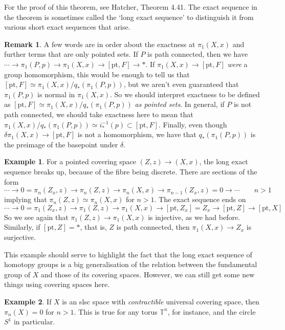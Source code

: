 \documentclass{tufte-handout}
\def\pt {\mathrm{pt}}
\theoremstyle{definition}
\newtheorem{example}{Example}
\newtheorem*{rem}{Remark}
\begin{document}
For the proof of this theorem, see Hatcher, Theorem 4.41. The exact sequence in the theorem is sometimes called the `long exact sequence' to distinguish it from various short exact sequences that arise.

\begin{rem}
A few words are in order about the exactness at $\pi_1(X,x)$ and further terms that are only pointed sets. If $P$ is path connected, then we have $\cdots \to \pi_1(P,p)\to \pi_1(X,x) \to [\pt,F] \to *$. If $\pi_1(X,x) \to [\pt,F]$ \emph{were} a group homomorphism, this would be enough to tell us that $[\pt,F] \simeq \pi_1(X,x)/q_*(\pi_1(P,p))$, but we aren't even guaranteed that $\pi_1(P,p)$ is normal in $\pi_1(X,x)$. So we should interpret exactness to be defined as $[\pt,F] \simeq \pi_1(X,x)/q_*(\pi_1(P,p))$ \emph{as pointed sets}. In general, if $P$ is not path connected, we should take exactness here to mean that $\pi_1(X,x)/q_*(\pi_1(P,p))\simeq i_*^{-1}(p)\subset [\pt,F]$. Finally, even though $\delta \pi_1(X,x) \to [\pt,F]$ is not a homomorphism, we have that $q_*(\pi_1(P,p))$ is the preimage of the basepoint under $\delta$.
\end{rem}

\begin{example}
For a pointed covering space $(Z,z)\to (X,x)$, the long exact sequence breaks up, because of the fibre being discrete. There are sections of the form
\[
  \cdots \to 0 = \pi_n(Z_x,z) \to \pi_n(Z,z) \to \pi_n(X,x) \to \pi_{n-1}(Z_x,z) = 0 \to \cdots \qquad n >1
\]
implying that $\pi_n(Z,z) \simeq \pi_n(X,x)$ for $n>1$. The exact sequence ends on
\[
  \cdots \to 0=\pi_1(Z_x,z) \to \pi_1(Z,z) \to \pi_1(X,x) \to [\pt,Z_x] = Z_x \to [\pt,Z]\to [\pt,X]
\]
So we see again that $\pi_1(Z,z) \to \pi_1(X,x)$ is injective, as we had before. Similarly, if $[\pt,Z]=\ast$, that is, $Z$ is path connected, then $\pi_1(X,x) \to Z_x$ is surjective. 
\end{example}

This example should serve to highlight the fact that the long exact sequence of homotopy groups is a big generalisation of the relation between the fundamental group of $X$ and those of its covering spaces. However, we can still get some new things using covering spaces here. 

\begin{example}
If $X$ is an slsc space with \emph{contractible} universal covering space, then $\pi_n(X) = 0$ for $n>1$. This is true for any torus $\mathbb{T}^n$, for instance, and the circle $S^1$ in particular.
\end{example}
\end{document}
